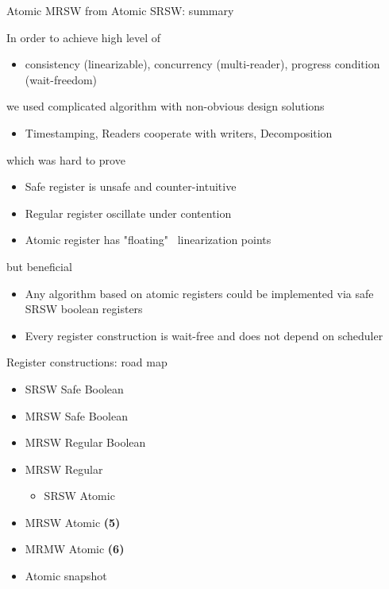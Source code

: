 \begin{frame}{Atomic MRSW from Atomic SRSW: summary}

In order to achieve high level of
\begin{itemize}
  \item consistency (linearizable), concurrency (multi-reader), progress condition (wait-freedom)
\end{itemize}

we used complicated algorithm with non-obvious design solutions
\begin{itemize}
  \item Timestamping, Readers cooperate with writers, Decomposition
\end{itemize}

\pause
which was hard to prove
\pause
\begin{itemize}
  \item Safe register is unsafe and counter-intuitive
  \item Regular register oscillate under contention
  \item Atomic register has "floating" \ linearization points
\end{itemize}

\pause
but beneficial
\pause
\begin{itemize}
  \item Any algorithm based on atomic registers could be implemented via safe SRSW boolean registers
  \item Every register construction is wait-free and does not depend on scheduler
\end{itemize}

\end{frame}


\begin{frame}{Register constructions: road map}

\begin{itemize}
  \item SRSW Safe Boolean 
  \item MRSW Safe Boolean 
  \item MRSW Regular Boolean 
  \item MRSW Regular
  \begin{itemize}
    \item SRSW Atomic     
  \end{itemize}
  \item MRSW Atomic \textbf{(5)}
  \item MRMW Atomic \textbf{(6)} 
  \item Atomic snapshot
\end{itemize}
\end{frame}

